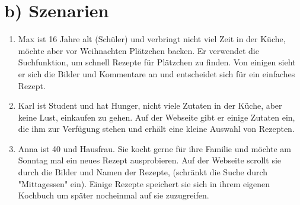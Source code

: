 \documentclass[parskip,10pt,abstracton]{scrartcl}
\begin{document}
\pagebreak
\section*{b) Szenarien}

\begin{enumerate}[(1)]
 \item Max ist 16 Jahre alt (Schüler) und verbringt nicht viel Zeit in der Küche, möchte aber vor Weihnachten Plätzchen backen. Er verwendet die Suchfunktion, um schnell Rezepte für Plätzchen zu finden. Von einigen sieht er sich die Bilder und Kommentare an und entscheidet sich für ein einfaches Rezept.
 
 
 \item Karl ist Student und hat Hunger, nicht viele Zutaten in der Küche, aber keine Lust, einkaufen zu gehen. Auf der Webseite gibt er einige Zutaten ein, die ihm zur Verfügung stehen und erhält eine kleine Auswahl von Rezepten.
 
 
 \item Anna ist 40 und Hausfrau. Sie kocht gerne für ihre Familie und möchte am Sonntag mal ein neues Rezept ausprobieren. Auf der Webseite scrollt sie durch die Bilder und Namen der Rezepte, (schränkt die Suche durch "Mittagessen" ein). Einige Rezepte speichert sie sich in ihrem eigenen Kochbuch um später nocheinmal auf sie zuzugreifen.
 
\end{enumerate}
\end{document}
